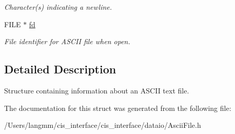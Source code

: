 \begin{DoxyCompactItemize}
\begin{DoxyCompactList}\small\item\em Character(s) indicating a newline. \end{DoxyCompactList}\item 
\mbox{\label{structasciiFile__t_a799e768ea6b00c3cdf49303950b015b6}} 
F\+I\+LE $\ast$ \mbox{\hyperlink{structasciiFile__t_a799e768ea6b00c3cdf49303950b015b6}{fd}}
\begin{DoxyCompactList}\small\item\em File identifier for A\+S\+C\+II file when open. \end{DoxyCompactList}\end{DoxyCompactItemize}


\subsection{Detailed Description}
Structure containing information about an A\+S\+C\+II text file. 

The documentation for this struct was generated from the following file\+:\begin{DoxyCompactItemize}
\item 
/\+Users/langmm/cis\+\_\+interface/cis\+\_\+interface/dataio/Ascii\+File.\+h\end{DoxyCompactItemize}
